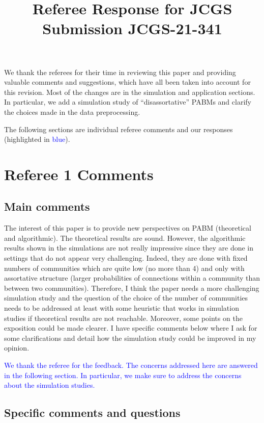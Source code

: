 \documentclass[
]{article}
\title{Referee Response for JCGS Submission JCGS-21-341}
\author{}
\date{\vspace{-2.5em}}
\begin{document}
\maketitle

We thank the referees for their time in reviewing this paper and
providing valuable comments and suggestions, which have all been taken
into account for this revision. Most of the changes are in the
simulation and application sections. In particular, we add a simulation
study of ``disassortative'' PABMs and clarify the choices made in the
data preprocessing.

The following sections are individual referee comments and our responses
(highlighted in \textcolor{blue}{blue}).

\hypertarget{referee-1-comments}{%
\section{Referee 1 Comments}\label{referee-1-comments}}

\hypertarget{main-comments}{%
\subsection{Main comments}\label{main-comments}}

The interest of this paper is to provide new perspectives on PABM
(theoretical and algorithmic). The theoretical results are sound.
However, the algorithmic results shown in the simulations are not really
impressive since they are done in settings that do not appear very
challenging. Indeed, they are done with fixed numbers of communities
which are quite low (no more than 4) and only with assortative structure
(larger probabilities of connections within a community than between two
communities). Therefore, I think the paper needs a more challenging
simulation study and the question of the choice of the number of
communities needs to be addressed at least with some heuristic that
works in simulation studies if theoretical results are not reachable.
Moreover, some points on the exposition could be made clearer. I have
specific comments below where I ask for some clarifications and detail
how the simulation study could be improved in my opinion.

\textcolor{blue}{
We thank the referee for the feedback. The concerns addressed here are answered in the following section. 
In particular, we make sure to address the concerns about the simulation studies. 
}

\hypertarget{specific-comments-and-questions}{%
\subsection{Specific comments and
questions}\label{specific-comments-and-questions}}
\end{document}
